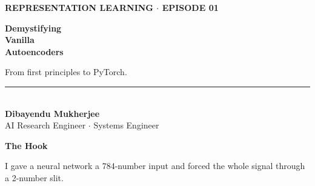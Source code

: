 \documentclass[11pt]{article}
\begin{document}
\thispagestyle{empty}
\vspace*{0.8in}
\begin{center}
    
    {\fontsize{14}{16}\selectfont\color{brandblue}\textbf{REPRESENTATION LEARNING \quad $\cdot$ \quad EPISODE 01}}
    
    \vspace{0.8in}
    
    {\fontsize{42}{50}\selectfont\color{brandnavy}\bfseries Demystifying\\Vanilla\\Autoencoders}
    
    \vspace{0.6in}
    
    {\fontsize{18}{24}\selectfont\color{brandgray}From first principles to PyTorch.}
    
    \vfill
    
    \begin{minipage}{0.8\textwidth}
        \centering
        \rule{0.6\linewidth}{0.5pt} \\
        \vspace{0.2in}
        {\fontsize{12}{14}\selectfont\color{brandnavy}\textbf{Dibayendu Mukherjee}} \\
        \vspace{0.05in}
        {\fontsize{10}{12}\selectfont\color{brandgray}AI Research Engineer \quad $\cdot$ \quad Systems Engineer}
    \end{minipage}
    
\end{center}
\newpage


\vspace*{1.8in}

\begin{center}
{\fontsize{26}{30}\selectfont\color{brandnavy}\bfseries The Hook}
\end{center}

\vspace{0.4in}

{\Large
I gave a neural network a 784-number input and forced the whole signal through a 2-number slit.
}

\vspace{0.3in}
\end{document}
